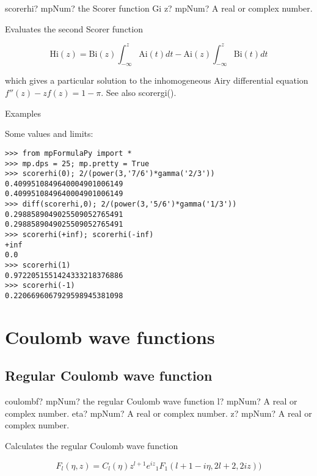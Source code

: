 \begin{mpFunctionsExtract}
	\mpFunctionOne
	{scorerhi? mpNum? the Scorer function Gi}
	{z? mpNum? A real or complex number.}
\end{mpFunctionsExtract}

\vpara
Evaluates the second Scorer function

\begin{equation}
\text{Hi}(z) = \text{Bi}(z) \int_{-\infty}^z \text{Ai}(t)dt - \text{Ai}(z) \int^z_{-\infty} \text{Bi}(t)dt 
\end{equation}

which gives a particular solution to the inhomogeneous Airy differential equation $f''(z)-z f(z) = 1-\pi$. See also scorergi().

Examples

Some values and limits:

\begin{lstlisting}
>>> from mpFormulaPy import *
>>> mp.dps = 25; mp.pretty = True
>>> scorerhi(0); 2/(power(3,'7/6')*gamma('2/3'))
0.4099510849640004901006149
0.4099510849640004901006149
>>> diff(scorerhi,0); 2/(power(3,'5/6')*gamma('1/3'))
0.2988589049025509052765491
0.2988589049025509052765491
>>> scorerhi(+inf); scorerhi(-inf)
+inf
0.0
>>> scorerhi(1)
0.9722051551424333218376886
>>> scorerhi(-1)
0.2206696067929598945381098
\end{lstlisting}


\newpage
\section{Coulomb wave functions}


\subsection{Regular Coulomb wave function}

\begin{mpFunctionsExtract}
	\mpFunctionThree
	{coulombf? mpNum? the regular Coulomb wave function}
	{l? mpNum? A real or complex number.}
	{eta? mpNum? A real or complex number.}
	{z? mpNum? A real or complex number.}		
\end{mpFunctionsExtract}


\vpara
Calculates the regular Coulomb wave function

\begin{equation}
F_l(\eta, z) = C_l(\eta) z^{l+1} e^{iz} {}_1F_1(l+1-i\eta, 2l+2,2iz))
\end{equation}


